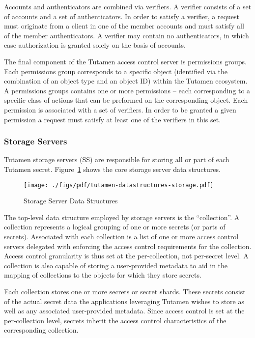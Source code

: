 Accounts and authenticators are combined via verifiers. A verifier
consists of a set of accounts and a set of authenticators. In order to
satisfy a verifier, a request must originate from a client in one of
the member accounts and must satisfy all of the member
authenticators. A verifier may contain no authenticators, in which
case authorization is granted solely on the basis of accounts.

The final component of the Tutamen access control server is
permissions groups. Each permissions group corresponds to a specific
object (identified via the combination of an object type and an object
ID) within the Tutamen ecosystem. A permissions groups contains one or
more permissions -- each corresponding to a specific class of actions
that can be preformed on the corresponding object. Each permission is
associated with a set of verifiers. In order to be granted a given
permission a request must satisfy at least one of the verifiers in
this set.

\subsubsection{Storage Servers}
\label{sec:tutamen:arch:ss}

Tutamen storage servers (SS) are responsible for storing all or part
of each Tutamen secret. Figure~\ref{fig:tutamen:storagestructs} shows
the core storage server data structures.

\begin{figure}[th]
  \centering
  \texttt{[image: ./figs/pdf/tutamen-datastructures-storage.pdf]}
  \caption{Storage Server Data Structures}
  \label{fig:tutamen:storagestructs}
\end{figure}

The top-level data structure employed by storage servers is the
``collection''. A collection represents a logical grouping of one or
more secrets (or parts of secrets). Associated with each collection is
a list of one or more access control servers delegated with enforcing
the access control requirements for the collection. Access control
granularity is thus set at the per-collection, not per-secret level. A
collection is also capable of storing a user-provided metadata to aid
in the mapping of collections to the objects for which they store
secrets.

Each collection stores one or more secrets or secret shards. These
secrets consist of the actual secret data the applications leveraging
Tutamen wishes to store as well as any associated user-provided
metadata. Since access control is set at the per-collection level,
secrets inherit the access control characteristics of the
corresponding collection.

